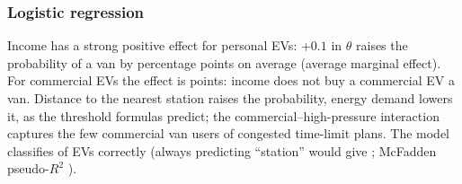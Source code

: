 \subsubsection{Logistic regression}
\begin{table}[H]
\centering\small
\caption{Logistic regression of $P(\text{served by a van})$ over the \LogitN{} free-choice EVs of all valid plans.}
\label{tab:logit}

\end{table}
Income has a strong positive effect for personal EVs: $+0.1$ in $\theta$ raises the probability of a van by \AMEThetaPers{} percentage points on average (average marginal effect). For commercial EVs the effect is \AMEThetaComm{} points: income does not buy a commercial EV a van. Distance to the nearest station raises the probability, energy demand lowers it, as the threshold formulas predict; the commercial--high-pressure interaction captures the few commercial van users of congested time-limit plans. The model classifies \LogitAcc\pct{} of EVs correctly (always predicting ``station'' would give \LogitBaseAcc\pct; McFadden pseudo-$R^2$ \LogitPseudoR).



